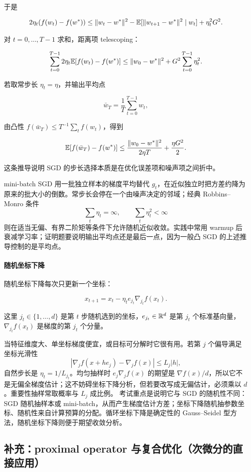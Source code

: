 于是

\[
  2\eta_t(f(w_t)-f(w^*))
  \le
  \|w_t-w^*\|^2
  -
  \mathbb{E}[\|w_{t+1}-w^*\|^2\mid w_t]
  +
  \eta_t^2G^2.
\]

对 \(t=0,\ldots,T-1\) 求和，距离项 telescoping：

\[
  \sum_{t=0}^{T-1}
  2\eta_t\mathbb{E}[f(w_t)-f(w^*)]
  \le
  \|w_0-w^*\|^2
  +
  G^2\sum_{t=0}^{T-1}\eta_t^2.
\]

若取常步长 \(\eta_t=\eta\)，并输出平均点

\[
  \bar w_T=\frac1T\sum_{t=0}^{T-1}w_t,
\]

由凸性 \(f(\bar w_T)\le T^{-1}\sum_t f(w_t)\)，得到

\[
  \mathbb{E}[f(\bar w_T)-f(w^*)]
  \le
  \frac{\|w_0-w^*\|^2}{2\eta T}
  +
  \frac{\eta G^2}{2}.
\]

这条推导说明 SGD 的步长选择本质是在优化误差项和噪声项之间折中。

mini-batch SGD 用一批独立样本的梯度平均替代 \(g_t\)，在近似独立时把方差约降为原来的批大小的倒数。常步长会停在一个由噪声决定的邻域；经典 Robbins--Monro 条件
\[
  \sum_t\eta_t=\infty,\qquad \sum_t\eta_t^2<\infty
\]
则在适当无偏、有界二阶矩等条件下允许随机近似收敛。实践中常用 warmup 后衰减学习率；证明题要说明输出平均点还是最后一点，因为一般凸 SGD 的上述推导控制的是平均点。

\paragraph{随机坐标下降}

随机坐标下降每次只更新一个坐标：

\[
  x_{t+1}
  =
  x_t-\eta_t e_{j_t}\nabla_{j_t}f(x_t).
\]

这里 \(j_t\in\{1,\ldots,d\}\) 是第 \(t\) 步随机选到的坐标，\(e_{j_t}\in\mathbb{R}^d\) 是第 \(j_t\) 个标准基向量，\(\nabla_{j_t}f(x_t)\) 是梯度的第 \(j_t\) 个分量。

当特征维度大、单坐标梯度便宜，或目标可分解时它很有用。若第 \(j\) 个偏导满足坐标光滑性
\[
  |\nabla_jf(x+he_j)-\nabla_jf(x)|\le L_j|h|,
\]
自然步长是 \(\eta_t=1/L_{j_t}\)。均匀抽样时 \(e_j\nabla_jf(x)\) 的期望是 \(\nabla f(x)/d\)，所以它不是无偏全梯度估计；这不妨碍坐标下降分析，但若要改写成无偏估计，必须乘以 \(d\)。重要性抽样常取概率与 \(L_j\) 成比例。
考试重点是说明它与 SGD 的随机性不同：SGD 随机抽样本或 mini-batch，从而产生梯度估计方差；坐标下降随机抽参数坐标、随机性来自计算预算的分配。循环坐标下降是确定性的 Gauss--Seidel 型方法，随机坐标下降则便于期望收敛分析。

\subsection{补充：proximal operator 与复合优化（次微分的直接应用）}


